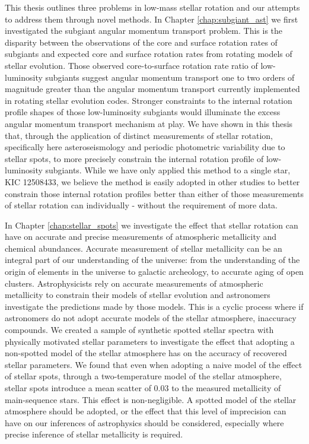 This thesis outlines three problems in low-mass stellar rotation and our attempts to address them through novel methods.
In Chapter \ref{chap:subgiant_ast} we first investigated the subgiant angular momentum transport problem.
This is the disparity between the observations of the core and surface rotation rates of subgiants and expected core and surface rotation rates from rotating models of stellar evolution.
Those observed core-to-surface rotation rate ratio of low-luminosity subgiants suggest angular momentum transport one to two orders of magnitude greater than the angular momentum transport currently implemented in rotating stellar evolution codes.
Stronger constraints to the internal rotation profile shapes of those low-luminosity subgiants would illuminate the excess angular momentum transport mechanism at play.
We have shown in this thesis that, through the application of distinct measurements of stellar rotation, specifically here asteroseismology and periodic photometric variability due to stellar spots, to more precisely constrain the internal rotation profile of low-luminosity subgiants.
While we have only applied this method to a single star, KIC 12508433, we believe the method is easily adopted in other studies to better constrain those internal rotation profiles better than either of those measurements of stellar rotation can individually - without the requirement of more data.

In Chapter \ref{chap:stellar_spots} we investigate the effect that stellar rotation can have on accurate and precise measurements of atmospheric metallicity and chemical abundances.
Accurate measurement of stellar metallicity can be an integral part of our understanding of the universe: from the understanding of the origin of elements in the universe to galactic archeology, to accurate aging of open clusters.
Astrophysicists rely on accurate measurements of atmospheric metallicity to constrain their models of stellar evolution and astronomers investigate the predictions made by those models.
This is a cyclic process where if astronomers do not adopt accurate models of the stellar atmosphere, inaccuracy compounds.
We created a sample of synthetic spotted stellar spectra with physically motivated stellar parameters to investigate the effect that adopting a non-spotted model of the stellar atmosphere has on the accuracy of recovered stellar parameters.
We found that even when adopting a naive model of the effect of stellar spots, through a two-temperature model of the stellar atmosphere, stellar spots introduce a mean scatter of 0.03 to the measured metallicity of main-sequence stars.
This effect is non-negligible. 
A spotted model of the stellar atmosphere should be adopted, or the effect that this level of imprecision can have on our inferences of astrophysics should be considered, especially where precise inference of stellar metallicity is required.

